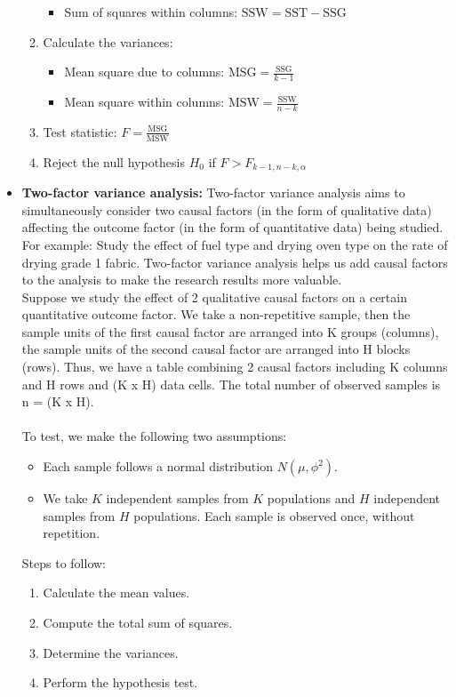 \documentclass{article}
\begin{document}
\begin{itemize}
\begin{enumerate}
\begin{itemize}
				\item Sum of squares within columns: \( \text{SSW} = \text{SST} - \text{SSG} \)
			\end{itemize}
			\item Calculate the variances:
			\begin{itemize}
				\item Mean square due to columns: \( \text{MSG} = \frac{\text{SSG}}{k-1} \)
				\item Mean square within columns: \( \text{MSW} = \frac{\text{SSW}}{n-k} \)
			\end{itemize}
			\item Test statistic: \( F = \frac{\text{MSG}}{\text{MSW}} \)
			\item Reject the null hypothesis \( H_0 \) if \( F > F_{k-1, n-k, \alpha} \)
		\end{enumerate}
		\item 
		\textbf{Two-factor variance analysis:} Two-factor variance analysis aims to simultaneously consider two causal factors (in the form of qualitative data) affecting the outcome factor (in the form of quantitative data) being studied. For example: Study the effect of fuel type and drying oven type on the rate of drying grade 1 fabric. Two-factor variance analysis helps us add causal factors to the analysis to make the research results more valuable.\\
		Suppose we study the effect of 2 qualitative causal factors on a certain quantitative outcome factor. We take a non-repetitive sample, then the sample units of the first causal factor are arranged into K groups (columns), the sample units of the second causal factor are arranged into H blocks (rows). Thus, we have a table combining 2 causal factors including K columns and H rows and (K x H) data cells. The total number of observed samples is n = (K x H).\\
		\\
		To test, we make the following two assumptions:
		\begin{itemize}
			\item Each sample follows a normal distribution \( N(\mu, \phi^2) \).
			\item We take \( K \) independent samples from \( K \) populations and \( H \) independent samples from \( H \) populations. Each sample is observed once, without repetition.
		\end{itemize}
		Steps to follow:
		\begin{enumerate}
			\item Calculate the mean values.
			\item Compute the total sum of squares.
			\item Determine the variances.
			\item Perform the hypothesis test.
		\end{enumerate}
	\end{itemize}
\end{document}
